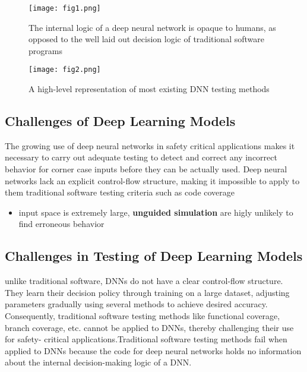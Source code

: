 \begin{figure*}[h]
	\centering
	\texttt{[image: fig1.png]}
	\caption{The internal logic of a deep neural network is opaque
	to humans, as opposed to the well laid out decision logic of
	traditional software programs \cite{Intro_1}}
	\label{fig:1}
\end{figure*}

\begin{figure*}[h]
	\centering
	\texttt{[image: fig2.png]}
	\caption{A high-level representation of most existing DNN
	testing methods \cite{Intro_1}}
	\label{fig:2}
\end{figure*}
	
\subsection{Challenges of Deep Learning Models}
The growing use of deep neural networks in safety critical applications makes it necessary to carry out adequate testing to detect and correct any incorrect behavior for corner case
inputs before they can be actually used. Deep neural networks
lack an explicit control-flow structure, making it impossible to
apply to them traditional software testing criteria such as code
coverage

\begin{itemize}
	\item input space is extremely large, \textbf{unguided simulation} are higly unlikely to find erroneous behavior
   \end{itemize}

\subsection{Challenges in Testing of Deep Learning Models} \hypertarget{challenges}{}
unlike traditional software, DNNs do not have a clear control-flow structure. They learn their decision policy through training on a large dataset, adjusting parameters gradually using several methods to achieve desired accuracy. Consequently, traditional software testing methods like functional coverage, branch coverage, etc. cannot be applied to DNNs, thereby challenging their use for safety- critical applications.Traditional software testing methods fail when applied to DNNs because the code for deep neural networks holds no information about the internal decision-making logic of a DNN.


